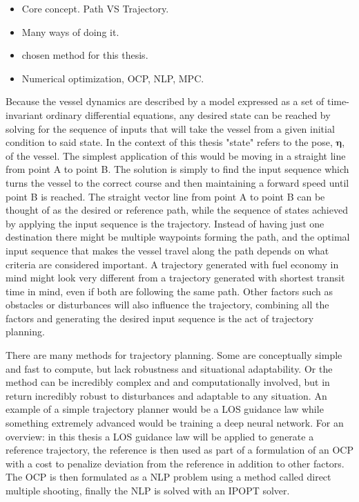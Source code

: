 \begin{itemize}
    \item Core concept. Path VS Trajectory.
    \item Many ways of doing it.
    \item chosen method for this thesis.
    \item Numerical optimization, OCP, NLP, MPC.
\end{itemize}

Because the vessel dynamics are described by a model expressed as a set of time-invariant ordinary differential equations, any desired state
can be reached by solving for the sequence of inputs that will take the vessel from a given initial condition to said state. In the context of this
thesis "state" refers to the pose, $\bm{\eta}$, of the vessel. The simplest application of this would be moving in a straight line from point A to point B.
The solution is simply to find the input sequence which turns the vessel to the correct course and then maintaining a forward speed until point B is reached.
The straight vector line from point A to point B can be thought of as the desired or reference path, while the sequence of states achieved by applying the 
input sequence is the trajectory. Instead of having just one destination there might be multiple waypoints forming the path, and the optimal
input sequence that makes the vessel travel along the path depends on what criteria are considered important. A trajectory generated with fuel
economy in mind might look very different from a trajectory generated with shortest transit time in mind, even if both are following the same path.
Other factors such as obstacles or disturbances will also influence the trajectory, combining all the factors and generating the desired
input sequence is the act of trajectory planning.

There are many methods for trajectory planning. Some are conceptually simple and fast to compute, but lack robustness and situational adaptability.
Or the method can be incredibly complex and and computationally involved, but in return incredibly robust to disturbances and adaptable to
any situation. An example of a simple trajectory planner would be a \gls{LOS} guidance law while something extremely advanced would be training a deep
neural network. For an overview: in this thesis a \gls{LOS} guidance law will be applied to generate a reference trajectory, the reference is then used as part of a
formulation of an \gls{OCP} with a cost to penalize deviation from the reference in addition to other factors. The \gls{OCP} is then formulated
as a \gls{NLP} problem using a method called direct multiple shooting, finally the \gls{NLP} is solved with an \gls{IPOPT} solver.

